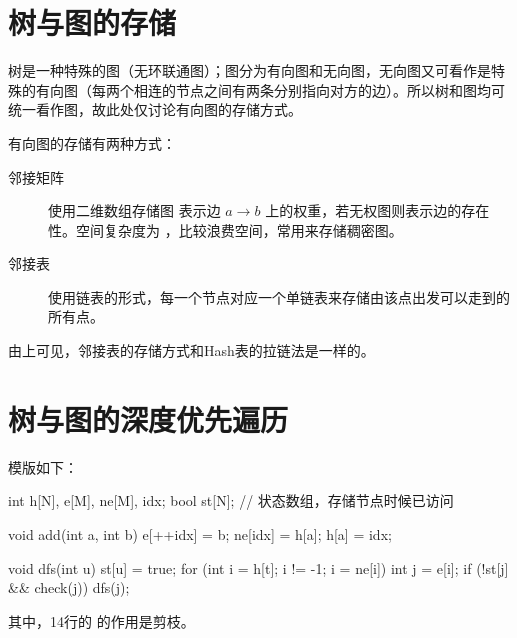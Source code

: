 \section{树与图的存储}
树是一种特殊的图（无环联通图）；图分为有向图和无向图，无向图又可看作是特殊的有向图（每两个相连的节点之间有两条分别指向对方的边）。所以树和图均可统一看作图，故此处仅讨论有向图的存储方式。

有向图的存储有两种方式：
\begin{description}
    \item[邻接矩阵]
    使用二维数组存储图  表示边 $a \rightarrow b$ 上的权重，若无权图则表示边的存在性。空间复杂度为  ，比较浪费空间，常用来存储稠密图。
    \item[邻接表]
    使用链表的形式，每一个节点对应一个单链表来存储由该点出发可以走到的所有点。
\end{description}
由上可见，邻接表的存储方式和Hash表的拉链法是一样的。


\section{树与图的深度优先遍历}

模版如下：
\begin{mycpptwocol}
    int h[N], e[M], ne[M], idx;
    bool st[N]; // 状态数组，存储节点时候已访问

    void add(int a, int b) {
        e[++idx] = b;
        ne[idx] = h[a];
        h[a] = idx;
    }

    void dfs(int u) {
        st[u] = true;
        for (int i = h[t]; i != -1; i = ne[i]) {
            int j = e[i];
            if (!st[j] && check(j)) {
                dfs(j);
            }
        }
    }
\end{mycpptwocol}
其中，14行的  的作用是剪枝。

